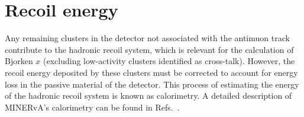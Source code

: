 


\section{Recoil energy}


Any remaining clusters in the detector not associated with the antimuon track contribute to the hadronic recoil system, which is relevant for the calculation of Bjorken $x$ (excluding low-activity clusters identified as cross-talk). However, the recoil energy deposited by these clusters must be corrected to account for energy loss in the passive material of the detector. This process of estimating the energy of the hadronic recoil system is known as calorimetry. A detailed description of MINERvA's calorimetry can be found in Refs.~\cite{calorimetryDevan,Aliaga_2014,Norrick:2018mwj}.

